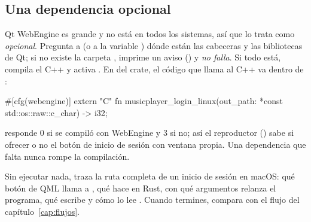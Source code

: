 \subsection{Una dependencia opcional}

Qt WebEngine es grande y no está en todos los sistemas, así que  lo
trata como \emph{opcional}. Pregunta a  (o a la variable ) dónde están
las cabeceras y las bibliotecas de Qt; si no existe la carpeta , imprime
un aviso () y \emph{no falla}. Si todo está, compila el C++ y activa
. En  del crate, el código que llama al C++
va dentro de :

\begin{rust}
#[cfg(webengine)]
extern "C" { fn musicplayer_login_linux(out_path: *const std::os::raw::c_char) -> i32; }
\end{rust}

 responde 0 si se compiló con WebEngine y 3 si no; así el
reproductor () sabe si ofrecer o no el botón de inicio de sesión
con ventana propia. Una dependencia que falta nunca rompe la compilación.

\begin{ejercicio}
Sin ejecutar nada, traza la ruta completa de un inicio de sesión en macOS: qué botón de QML
llama a , qué hace  en Rust, con qué
argumentos relanza el programa, qué escribe  y cómo lo lee .
Cuando termines, compara con el flujo del capítulo~\ref{cap:flujos}.
\end{ejercicio}
